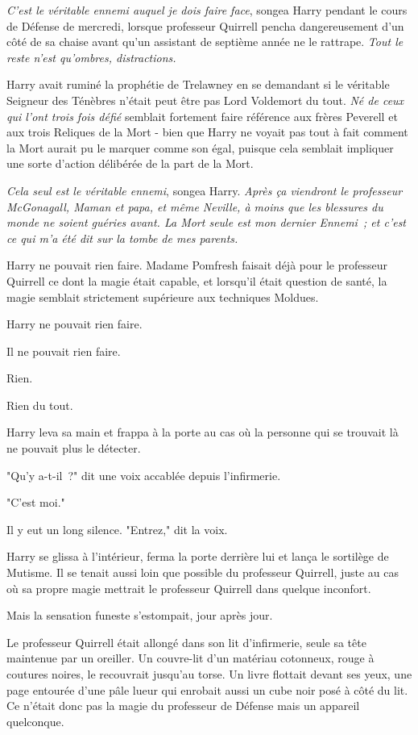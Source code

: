\emph{C'est le véritable ennemi auquel je dois faire face}, songea Harry pendant le cours de Défense de mercredi, lorsque professeur Quirrell pencha dangereusement d'un côté de sa chaise avant qu'un assistant de septième année ne le rattrape. \emph{Tout le reste n'est qu'ombres, distractions.}

Harry avait ruminé la prophétie de Trelawney en se demandant si le véritable Seigneur des Ténèbres n'était peut être pas Lord Voldemort du tout. \emph{Né de ceux qui l'ont trois fois défié} semblait fortement faire référence aux frères Peverell et aux trois Reliques de la Mort - bien que Harry ne voyait pas tout à fait comment la Mort aurait pu le marquer comme son égal, puisque cela semblait impliquer une sorte d'action délibérée de la part de la Mort.

\emph{Cela seul est le véritable ennemi}, songea Harry. \emph{Après ça viendront le professeur McGonagall, Maman et papa, et même Neville, à moins que les blessures du monde ne soient guéries avant. La Mort seule est mon dernier Ennemi~; et c'est ce qui m'a été dit sur la tombe de mes parents.}

Harry ne pouvait rien faire. Madame Pomfresh faisait déjà pour le professeur Quirrell ce dont la magie était capable, et lorsqu'il était question de santé, la magie semblait strictement supérieure aux techniques Moldues.

Harry ne pouvait rien faire.

Il ne pouvait rien faire.

Rien.

Rien du tout.

\later

Harry leva sa main et frappa à la porte au cas où la personne qui se trouvait là ne pouvait plus le détecter.

"Qu'y a-t-il~?" dit une voix accablée depuis l'infirmerie.

"C'est moi."

Il y eut un long silence. "Entrez," dit la voix.

Harry se glissa à l'intérieur, ferma la porte derrière lui et lança le sortilège de Mutisme. Il se tenait aussi loin que possible du professeur Quirrell, juste au cas où sa propre magie mettrait le professeur Quirrell dans quelque inconfort.

Mais la sensation funeste s'estompait, jour après jour.

Le professeur Quirrell était allongé dans son lit d'infirmerie, seule sa tête maintenue par un oreiller. Un couvre-lit d'un matériau cotonneux, rouge à coutures noires, le recouvrait jusqu'au torse. Un livre flottait devant ses yeux, une page entourée d'une pâle lueur qui enrobait aussi un cube noir posé à côté du lit. Ce n'était donc pas la magie du professeur de Défense mais un appareil quelconque.

